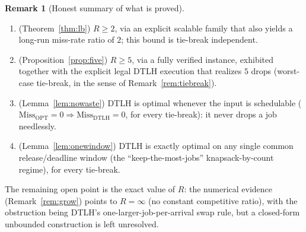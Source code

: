 \documentclass{amsart}
\theoremstyle{definition}
\newtheorem{remark}[theorem]{Remark}
\begin{document}
\begin{remark}[Honest summary of what is proved]
\begin{enumerate}
\item (Theorem~\ref{thm:lb}) $R\ge 2$, via an explicit scalable family that also
yields a long-run miss-rate ratio of $2$; this bound is tie-break independent.
\item (Proposition~\ref{prop:five}) $R\ge 5$, via a fully verified instance,
exhibited together with the explicit legal DTLH execution that realizes $5$
drops (worst-case tie-break, in the sense of Remark~\ref{rem:tiebreak}).
\item (Lemma~\ref{lem:nowaste}) DTLH is optimal whenever the input is
schedulable ($\mathrm{Miss}_{\mathrm{OPT}}=0\Rightarrow
\mathrm{Miss}_{\mathrm{DTLH}}=0$, for every tie-break): it never drops a job
needlessly.
\item (Lemma~\ref{lem:onewindow}) DTLH is exactly optimal on any single common
release/deadline window (the ``keep-the-most-jobs'' knapsack-by-count regime),
for every tie-break.
\end{enumerate}
The remaining open point is the exact value of $R$: the numerical evidence
(Remark~\ref{rem:grow}) points to $R=\infty$ (no constant competitive ratio),
with the obstruction being DTLH's one-larger-job-per-arrival swap rule, but a
closed-form unbounded construction is left unresolved.
\end{remark}
\end{document}
